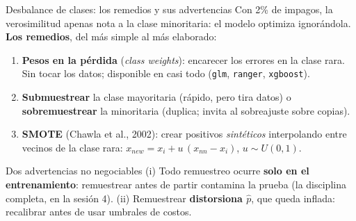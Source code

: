 \documentclass{beamer}
\newcommand{\1}{\mathbb{I}}
\begin{document}
\begin{frame}{Desbalance de clases: los remedios y sus advertencias}
\small
Con 2\% de impagos, la verosimilitud apenas nota a la clase minoritaria: el modelo optimiza ignorándola. \textbf{Los remedios}, del más simple al más elaborado:
\begin{enumerate}\itemsep3pt
  \item \textbf{Pesos en la pérdida} (\emph{class weights}): encarecer los errores en la clase rara. Sin tocar los datos; disponible en casi todo (\texttt{glm}, \texttt{ranger}, \texttt{xgboost}).
  \item \textbf{Submuestrear} la clase mayoritaria (rápido, pero tira datos) o \textbf{sobremuestrear} la minoritaria (duplica; invita al sobreajuste sobre copias).
  \item \textbf{SMOTE} (Chawla et al., 2002): crear positivos \emph{sintéticos} interpolando entre vecinos de la clase rara: $x_{new} = x_i + u\,(x_{nn} - x_i)$, $u \sim U(0,1)$.
\end{enumerate}
\pause
\vspace{0.1cm}
\begin{block}{Dos advertencias no negociables}
(i) Todo remuestreo ocurre \textbf{solo en el entrenamiento}: remuestrear antes de partir contamina la prueba (la disciplina completa, en la sesión 4). (ii) Remuestrear \textbf{distorsiona $\hat{p}$}, que queda inflada: recalibrar antes de usar umbrales de costos.
\end{block}
\end{frame}
\end{document}
